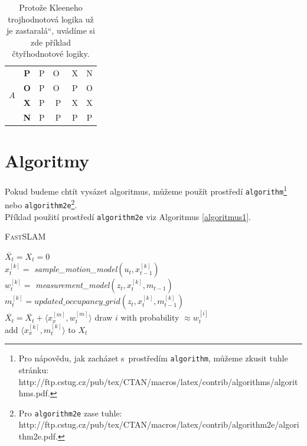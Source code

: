 \documentclass[11pt, a4paper, czech]{article}
\providecommand{\uv}[1]{\quotedblbase #1\textquotedblleft}
\begin{document}
\begin{table}[h]
\begin{center}
\begin{tabular}{| c | c | c | c | c | c |}
       				 \multirow{ 4}{*}{$A$} & \textbf{P} & P & O~& X & N\\ \cline{2-6}
       			        & \textbf{O} & P & O~& P & O\\ \cline{2-6}
      				 & \textbf{X} & P & P & X & X\\ \cline{2-6}
				    & \textbf{N} & P & P & P & P\\ \hline
  		\end{tabular}
		\caption{Protože Kleeneho trojhodnotová logika už je \uv{zastaralá}, uvádíme si zde příklad čtyřhodnotové logiky.}
		\newpage
		\label{tabulka2}
	\end{center}
\end{table}

\section{Algoritmy} \label{sekce3}
Pokud budeme chtít vysázet algoritmus, můžeme použít prostředí \texttt{algorithm}\footnote{Pro nápovědu, jak zacházet s~prostředím \texttt{algorithm}, můžeme zkusit tuhle stránku:\\
http://ftp.cstug.cz/pub/tex/CTAN/macros/latex/contrib/algorithms/algorithms.pdf.} nebo \texttt{algorithm2e}\footnote{Pro \texttt{algorithm2e} zase tuhle:
http://ftp.cstug.cz/pub/tex/CTAN/macros/latex/contrib/algorithm2e/algorithm2e.pdf.}.\\
Příklad použití prostředí \texttt{algorithm2e} viz Algoritmus \ref{algoritmus1}.\\
\bigskip

\begin{algorithm}[H]
\label{algoritmus1}
\caption{\textsc{Fast}SLAM}
\SetNlSty{}{}{:  } 
\SetInd{1em}{1em}
\SetNlSkip{-1.5em}

\BlankLine
\Indp \Indp
	$ \overline{X_t} = X_t = 0$ \\
    	{$x_t^{[k]} =$ \emph{sample\_motion\_model}$(u_t,x_{t-1}^{[k]})$ \\
        $w_t^{[k]} =$ \emph{measurement\_model}$(z_t,x_t^{[k]},m_{t-1})$ \\
        $m_t^{[k]} = updated\_occupancy\_grid(z_t,x_t^{[k]},m_{t-1}^{[k]})$ \\
        $ \overline{X_t} = \overline{X_t} + \langle x_x^{[m]},w_t^{[m]} \rangle$  }
          {
        draw $i$ with probability $ \approx w_t^{[i]}$ \\
        add $ \langle x_x^{[k]},m_t^{[k]} \rangle$ to $X_t$ \\}
\end{algorithm}
\end{document}
